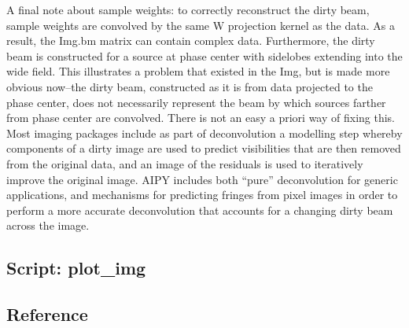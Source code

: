 A final note about sample weights: to correctly reconstruct the dirty beam,
sample weights are convolved by the same W projection kernel as the data.
As a result, the Img.bm matrix can contain complex data.  Furthermore, the
dirty beam is constructed for a source at phase center with sidelobes
extending into the wide field. This illustrates a problem that existed
in the Img, but is made more obvious now--the dirty beam, constructed as
it is from data projected to the phase center, does not necessarily represent
the beam by which sources farther from phase center are convolved.  There
is not an easy a priori way of fixing this.  Most imaging packages include
as part of deconvolution a modelling step whereby components of a dirty
image are used to predict visibilities that are then removed from the
original data, and an image of the residuals is used to iteratively improve
the original image.  AIPY includes both ``pure'' deconvolution for
generic applications, and mechanisms for predicting fringes from pixel
images in order to perform a more accurate deconvolution that accounts for
a changing dirty beam across the image.

\subsection{Script: plot\_img}

\subsection{Reference}


